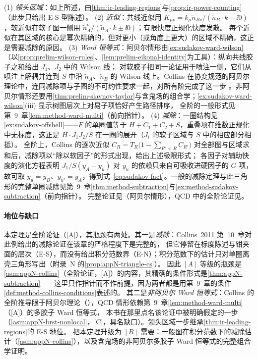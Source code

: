 \begin{proofsketch}
(1) \emph{领头区域}：如上所述，由\cref{thm:ir-leading-regions}与\cref{prop:ir-power-counting}（此步只给出 E-S 型陈述）。
(2) \emph{近似}：共线近似用 $K_{\mu\nu}=k_\mu\tilde n_{B\nu}/(\tilde n_B\cdot k-\ii0)$，软近似在软子图一侧用 $\tilde n_A^\nu/(\tilde n_A\cdot k\pm\ii0)$；有限快度正规化快度发散。
每个近似在其区域的核心是幂次精确的，但对更小（或角度上更大）的区域不精确，这正是需要减除的原因\cite[第~10.4、10.6~节]{Collins2011}。
(3) \emph{Ward 恒等式}：阿贝尔情形由\cref{ex:sudakov-ward-wilson}（以\cref{prop:prelim-wilson-rules}、\cref{lem:prelim-eikonal-identity}为工具）：纵向共线胶子之和给出 $J_1$、$J_2$ 中的 Wilson 线；
对软胶子把同一论证用于喷注一侧，它们从喷注上解耦并连到 $S$ 中沿 $\tilde n_A$、$\tilde n_B$ 的 Wilson 线上。Collins 在协变规范的阿贝尔理论中，连同减除项与子图的不可约性要求一起，对所有阶完成了这一步
\cite[第~10.8.3--10.8.5~节]{Collins2011}。非阿贝尔情形还要用\cref{thm:prelim-slavnov-taylor}与含鬼场的组合学；\cref{ex:sudakov-ward-wilson}(iii) 显示树图层次上对易子项恰好产生路径排序，
全阶的一般形式见第~9~章\cref{lem:method-ward-multi}（前向指针）。
(4) \emph{减除}：一圈结构见\cref{ex:sudakov-offshell}——$F$ 的单圈值等于 $H+C_1+C_2+S$，重叠项在维数正规化中无标度，这正是 $H\cdot J_1J_2/S$ 在一圈的展开（$J_i$ 的软子区域与 $S$ 中的相应部分相抵）。
全阶上，Collins 的逐次近似 $C_R=T_R\big(1-\sum_{R'<R}C_{R'}\big)$ 对全部图与区域求和后，减除项以“除以软因子”的形式出现，给出上述极限形式\cite[式~(10.11)、(10.94)、(10.109)]{Collins2011}；
各因子对辅助快度的演化方程\cite[第~10.10~节]{Collins2011}表明 $J_1/S(y_A-y_u)$ 对 $y_u$ 的依赖只来自可吸收进硬因子的 $G$ 项，
故可取 $y_u=y_B$、$y_{u'}=y_A$，得到式~\eqref{eq:sudakov-fact}。一般的减除定理与此三角形的完整单圈减除见第~9~章\cref{thm:method-subtraction}与\cref{ex:method-sudakov-subtraction}（前向指针）。
完整论证见\cite[第~10.3、10.8--10.10~节]{Collins2011}（阿贝尔情形），QCD 中的全阶论证见\cite{Mueller:1979ih,Collins:1980ih,Sen:1981sd,Collins:1989bt,Magnea:1990zb}。
\end{proofsketch}

\paragraph{地位与缺口}本定理是全阶论证（[A]），其瓶颈有两处。其一是\emph{减除}：Collins~2011 第~10~章对此例给出的减除论证在该章的严格程度下是完整的，
但它停留在标度陈述与钳夹面的层次（E-S），而没有给出积分范数界（E-N）；积分范数下的估计只对单圈离壳三角形写出（附录~N 的\cref{prop:appN-triangle-cs}）。
因此 $[A]$ 等级的瓶颈是\cref{asm:appN-collins}（全阶论证，[A]）的内容，其精确的条件形式是\cref{thm:appN-subtraction}——这里只作指针而不作前提，因为两者都是用第~9~章的条件\cref{def:method-collins-conditions}表述的。
其二是\emph{非阿贝尔 Ward 恒等式}：Collins 的全阶推导限于阿贝尔理论（\cite[第~10.8.3~节]{Collins2011}），QCD 情形依赖第~9~章\cref{lem:method-ward-multi}（[A]）的多胶子 Ward 恒等式，
本书在那里点名该论证中被明确假定的一步（\cref{asm:appN-brst-nonlocal}，[C]，具名缺口）。领头区域一步继承\cref{thm:ir-leading-regions}的 E-S 地位。
把本定理升级为 $[R]$ 需要：一般图在积分范数下的减除估计（\cref{asm:appN-collins}），以及含鬼场的非阿贝尔多胶子 Ward 恒等式的完整组合学证明。

